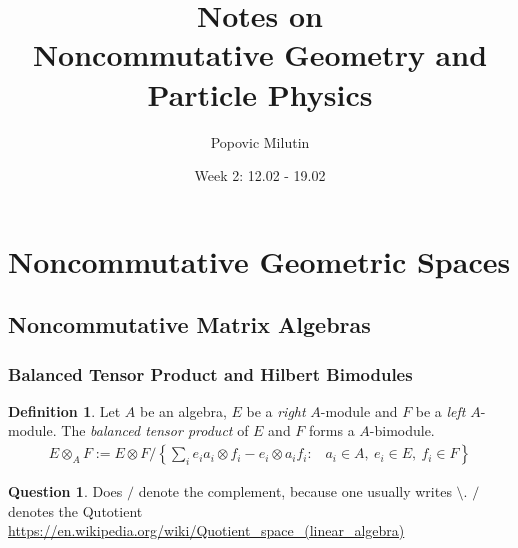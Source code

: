 \documentclass[a4paper]{article}
\title{Notes on \\ Noncommutative Geometry and Particle Physics}
\author{Popovic Milutin}
\date{Week 2: 12.02 - 19.02}
\theoremstyle{definition}
\newtheorem{definition}{Definition}
\theoremstyle{definition}
\newtheorem{question}{Question}
\theoremstyle{definition}
\theoremstyle{theorem}
\theoremstyle{theorem}
\theoremstyle{theorem}
\theoremstyle{definition}
\begin{document}
\maketitle
\tableofcontents

\section{Noncommutative Geometric Spaces}
\subsection{Noncommutative Matrix Algebras}
\subsubsection{Balanced Tensor Product and Hilbert Bimodules}

\begin{definition}
    Let $A$ be an algebra, $E$ be a \textit{right} $A$-module and $F$ be a \textit{left} $A$-module.
    The \textit{balanced tensor product} of $E$ and $F$ forms a $A$-bimodule.
    \begin{align*}
        E \otimes _A F := E \otimes F / \left\{\sum _i e_i a_i \otimes f_i - e_i \otimes a_i f_i : \;\;\;
                                         a_i \in A,\ e_i \in E,\ f_i \in F \right\}
    \end{align*}
\end{definition}
\begin{question}
    Does $/$ denote the complement, because one usually writes $\setminus$.
    $/$ denotes the Qutotient \url{https://en.wikipedia.org/wiki/Quotient_space_(linear_algebra)}
\end{question}
\end{document}
